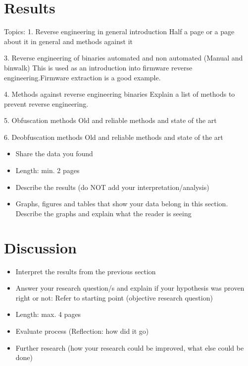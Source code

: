 \documentclass[]{report}
\begin{document}
\section{Results}

Topics:
1. Reverse engineering in general introduction 
	Half a page or a page about it in general and methods against it
	
3. Reverse engineering of binaries automated and non automated (Manual and binwalk)
	This is used as an introduction into firmware reverse engineering.Firmware extraction is a good example.

4. Methods against reverse engineering binaries
	Explain a list of methods to prevent reverse engineering.
	
5. Obfuscation methods 
	Old and reliable methods and state of the art
	
6. Deobfuscation methods
	Old and reliable methods and state of the art


\begin{itemize}
	\item Share the data you found
	\item Length: min. 2 pages
	\item Describe the results (do NOT add your interpretation/analysis)
	\item Graphs, figures and tables that show your data belong in this section. Describe the graphs and explain what the reader is seeing

\end{itemize}

	
\section{Discussion}
\begin{itemize}
	\item Interpret the results from the previous section
	\item Answer your research question/s and explain if your hypothesis was proven right or not: Refer to starting point (objective research question)

	\item Length: max. 4 pages
	\item Evaluate process (Reflection: how did it go)
	\item Further research (how your research could be improved, what else could be done)
\end{itemize}
\end{document}
